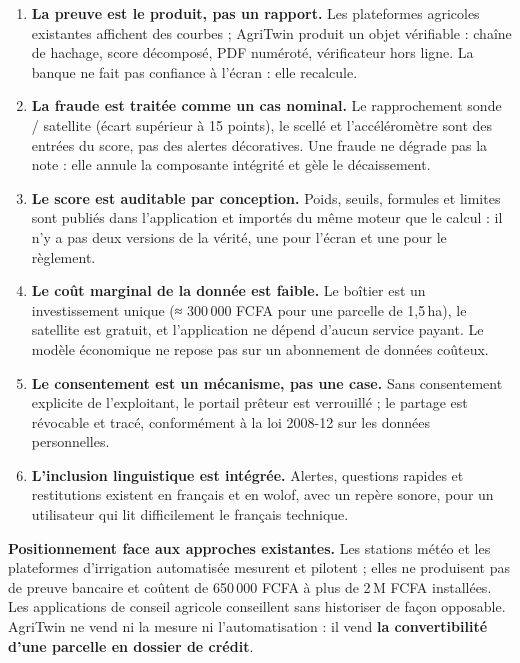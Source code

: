 \documentclass[12pt, a4paper]{article}
\begin{document}
\begin{enumerate}
  \item \textbf{La preuve est le produit, pas un rapport.} Les plateformes agricoles
        existantes affichent des courbes ; AgriTwin produit un objet vérifiable : chaîne
        de hachage, score décomposé, PDF numéroté, vérificateur hors ligne. La banque ne
        fait pas confiance à l'écran : elle recalcule.

  \item \textbf{La fraude est traitée comme un cas nominal.} Le rapprochement
        sonde / satellite (écart supérieur à 15 points), le scellé et l'accéléromètre sont
        des entrées du score, pas des alertes décoratives. Une fraude ne dégrade pas la
        note : elle annule la composante intégrité et gèle le décaissement.

  \item \textbf{Le score est auditable par conception.} Poids, seuils, formules et limites
        sont publiés dans l'application et importés du même moteur que le calcul : il n'y a
        pas deux versions de la vérité, une pour l'écran et une pour le règlement.

  \item \textbf{Le coût marginal de la donnée est faible.} Le boîtier est un investissement
        unique (≈ 300\,000 FCFA pour une parcelle de 1,5\,ha), le satellite est gratuit,
        et l'application ne dépend d'aucun service payant. Le modèle économique ne repose
        pas sur un abonnement de données coûteux.

  \item \textbf{Le consentement est un mécanisme, pas une case.} Sans consentement explicite
        de l'exploitant, le portail prêteur est verrouillé ; le partage est révocable et
        tracé, conformément à la loi 2008-12 sur les données personnelles.

  \item \textbf{L'inclusion linguistique est intégrée.} Alertes, questions rapides et
        restitutions existent en français et en wolof, avec un repère sonore, pour un
        utilisateur qui lit difficilement le français technique.
\end{enumerate}

\begin{mdframed}[style=neutral]
\textbf{Positionnement face aux approches existantes.} Les stations météo et les
plateformes d'irrigation automatisée mesurent et pilotent ; elles ne produisent pas de
preuve bancaire et coûtent de 650\,000 FCFA à plus de 2\,M FCFA installées. Les
applications de conseil agricole conseillent sans historiser de façon opposable. AgriTwin
ne vend ni la mesure ni l'automatisation : il vend \textbf{la convertibilité d'une parcelle
en dossier de crédit}.
\end{mdframed}
\end{document}
